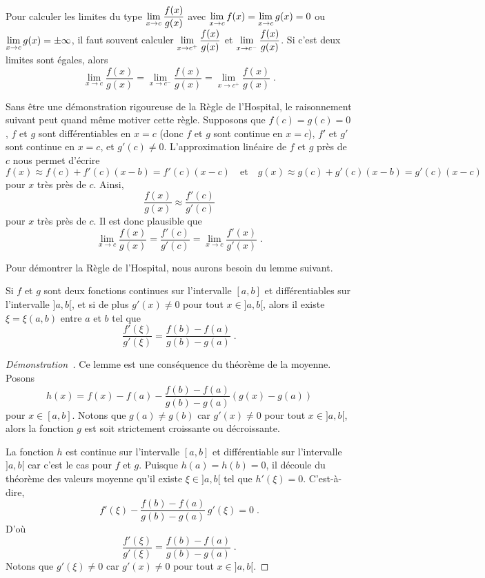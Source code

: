 {\begin{rmk}
Pour calculer les limites du type
$\displaystyle \lim_{x\rightarrow c} \frac{f(x)}{g(x)}$ avec
$\displaystyle \lim_{x\rightarrow c} f(x) = \lim_{x\rightarrow c} g(x) = 0$
ou $\displaystyle \lim_{x\rightarrow c} g(x) = \pm \infty$, il faut
souvent calculer
$\displaystyle \lim_{x\rightarrow c^+} \frac{f(x)}{g(x)}$
et $\displaystyle \lim_{x\rightarrow c^-} \frac{f(x)}{g(x)}$.  Si
c'est deux limites sont égales, alors
\[
\lim_{x\rightarrow c} \frac{f(x)}{g(x)} =
\lim_{x\rightarrow c^-} \frac{f(x)}{g(x)} =
\lim_{x\rightarrow c^+} \frac{f(x)}{g(x)} \; .
\]
\end{rmk}

Sans être une démonstration rigoureuse de la Règle de l'Hospital, le
raisonnement suivant peut quand même motiver cette règle.  Supposons
que $f(c)=g(c)=0$, $f$ et $g$ sont différentiables en $x=c$ (donc $f$
et $g$ sont continue en $x=c$), $f'$ et $g'$ sont continue
en $x=c$, et $g'(c)\neq 0$.  L'approximation linéaire de $f$ et $g$
près de $c$ nous permet d'écrire
\[
f(x) \approx f(c) + f'(c)(x-b) = f'(c) (x-c) \quad \text{et} \quad
g(x) \approx g(c) + g'(c)(x-b) = g'(c) (x-c)
\]
pour $x$ très près de $c$.  Ainsi,
\[
\frac{f(x)}{g(x)} \approx \frac{f'(c)}{g'(c)}
\]
pour $x$ très près de $c$.  Il est donc plausible que
\[
\lim_{x\rightarrow c} \frac{f(x)}{g(x)} = \frac{f'(c)}{g'(c)}
= \lim_{x\rightarrow c} \frac{f'(x)}{g'(x)} \; .
\]

Pour démontrer la Règle de l'Hospital, nous aurons besoin du lemme suivant.

\begin{lemma}
Si $f$ et $g$ sont deux fonctions continues sur l'intervalle $[a,b]$
et différentiables sur l'intervalle $]a,b[$, et si de plus
$g'(x)\neq 0$ pour tout $x\in]a,b[$, alors il existe $\xi = \xi(a,b)$
entre $a$ et $b$ tel que
\[
\frac{f'(\xi)}{g'(\xi)} = \frac{f(b)-f(a)}{g(b)-g(a)} \; .
\]
\end{lemma}

\begin{proof}[Démonstration\ \theory]
Ce lemme est une conséquence du théorème de la moyenne.  Posons
\[
h(x) = f(x) - f(a) - \frac{f(b)-f(a)}{g(b)-g(a)}
\left(g(x)-g(a)\right)
\]
pour $x\in[a,b]$.  Notons que $g(a)\neq g(b)$ car $g'(x)\neq 0$ pour
tout $x\in]a,b[$, alors la fonction $g$ est soit strictement
croissante ou décroissante.

La fonction $h$ est continue sur l'intervalle $[a,b]$ et
différentiable sur l'intervalle $]a,b[$ car c'est le cas pour $f$ et
$g$.  Puisque $h(a) = h(b) = 0$, il découle du théorème des valeurs
moyenne qu'il existe $\xi\in ]a,b[$ tel que $h'(\xi)=0$.
C'est-à-dire,
\[
f'(\xi) - \frac{f(b)-f(a)}{g(b)-g(a)} \, g'(\xi) = 0 \; .
\]
D'où
\[
\frac{f'(\xi)}{g'(\xi)} = \frac{f(b)-f(a)}{g(b)-g(a)} \; .
\]
Notons que $g'(\xi) \neq 0$ car $g'(x)\neq 0$ pour tout $x\in]a,b[$.
\end{proof}

}
